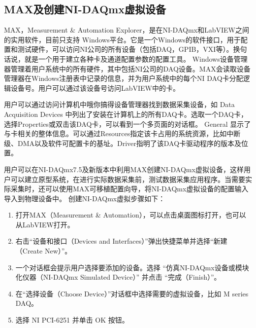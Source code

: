 \subsection{MAX及创建NI-DAQmx虚拟设备}
MAX，Measurement \& Automation Explorer，是在NI-DAQmx和LabVIEW之间的实用软件，目前只支持 Windows平台。它是一个Windows的软件接口，用于配置和测试硬件，可以访问NI公司的所有设备（包括DAQ，GPIB，VXI等）。换句话说，就是一个用于建立各种卡及通道配置参数的配置工具。 Windows设备管理器管理着用户系统中的所有硬件，其中包括NI公司的DAQ设备。MAX会读取设备管理器在Windows注册表中记录的信息，并为用户系统中的每个NI DAQ卡分配逻辑设备号。用户可以通过该设备号访问LabVIEW中的卡。

用户可以通过访问计算机中哦你搞得设备管理器找到数据采集设备，如 Data Acquisition Devices 中列出了安装在计算机上的所有DAQ卡。选取一个DAQ卡，选择Properties或双击该DAQ卡，可以看到一个多页面的对话框。 General 显示了与卡相关的整体信息。可以通过Resources指定该卡占用的系统资源，比如中断级、DMA以及软件可配置卡的基址。Driver指明了该DAQ卡驱动程序的版本及位置。

用户可以在NI-DAQmx7.5及新版本中利用MAX创建NI-DAQmx虚拟设备，这样用户可以建立原型系统，在进行实际数据采集前，测试数据采集应用程序。当需要实际采集时，还可以使用MAX可移植配置向导，将NI-DAQmx虚拟设备的配置输入导入到物理设备中。
创建NI-DAQmx虚拟步骤如下：
\begin{enumerate}
\item 打开MAX（Measurement \& Automation），可以点击桌面图标打开，也可以从LabVIEW打开。

\item 右击“设备和接口（Devices and Interfaces）”弹出快捷菜单并选择“新建（Create New）”。

\item 一个对话框会提示用户选择要添加的设备。选择 “仿真NI-DAQmx设备或模块化仪器（NI-DAQmx Simulated Device）” 并点击 “完成（Finish）”。

\item 在“选择设备（Choose Device）”对话框中选择需要的虚拟设备，比如 M series DAQ。

\item 选择 NI PCI-6251 并单击 OK 按钮。
\end{enumerate}


